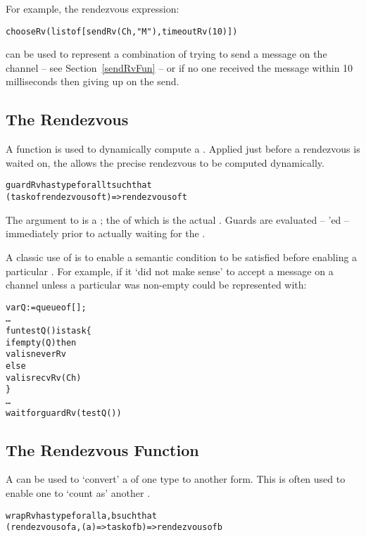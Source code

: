 For example, the rendezvous expression:
\begin{alltt}
chooseRv(list of [sendRv(Ch,"M"), timeoutRv(10)])
\end{alltt}
can be used to represent a combination of trying to send a message on the  channel -- see Section~\vref{sendRvFun} -- or if no one received the message within 10 milliseconds then giving up on the send.

\subsection{The  Rendezvous}
\label{guardRvFun}

A  function is used to dynamically compute a . Applied just before a rendezvous is waited on, the  allows the precise rendezvous to be computed dynamically.

\begin{alltt}
guardRv has type for all t such that
                 (task of rendezvous of t) => rendezvous of t
\end{alltt}

The argument to  is a ; the  of which is the actual . Guards are evaluated -- 'ed -- immediately prior to actually waiting for the . 

A classic use of  is to enable a semantic condition to be satisfied before enabling a particular . For example, if it `did not make sense' to accept a message on a channel unless a particular  was non-empty could be represented with:
\begin{alltt}
var Q := queue of [];
\ldots
fun testQ() is task\{
  if empty(Q) then
    valis neverRv
  else
    valis recvRv(Ch)
\}
\ldots
wait for guardRv(testQ())
\end{alltt}

\subsection{The  Rendezvous Function}
\label{wrapRvFun}

A  can be used to `convert' a  of one type to another form. This is often used to enable one  to `count as' another .

\begin{alltt}
wrapRv has type for all a,b such that 
                (rendezvous of a, (a) => task of b) => rendezvous of b
\end{alltt}


